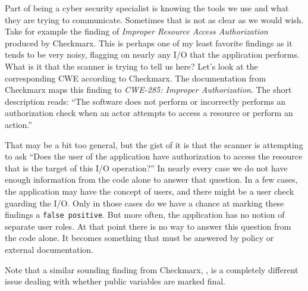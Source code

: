 Part of being a cyber security specialist is knowing the tools we use and what they are trying to communicate. Sometimes that is not as clear as we would wish. Take for example the finding of \textit{Improper Resource Access Authorization} produced by Checkmarx. This is perhaps one of my least favorite findings as it tends to be very noisy, flagging on nearly any I/O that the application performs. What is it that the scanner is trying to tell us here? Let's look at the corresponding CWE according to Checkmarx. The documentation from Checkmarx maps this finding to \textit{CWE-285: Improper Authorization}. The short description reads: ``The software does not perform or incorrectly performs an authorization check when an actor attempts to access a resource or perform an action.'' 

That may be a bit too general, but the gist of it is that the scanner is attempting to ask ``Does the user of the application have authorization to access the resource that is the target of this I/O operation?'' In nearly every case we do not have enough information from the code alone to answer that question. In a few cases, the application may have the concept of users, and there might be a user check guarding the I/O. Only in those cases do we have a chance at marking these findings a \texttt{false positive}. But more often, the application has no notion of separate user roles. At that point there is no way to answer this question from the code alone. It becomes something that must be answered by policy or external documentation.

Note that a similar sounding finding from Checkmarx, , is a completely different issue dealing with whether public variables are marked final.
